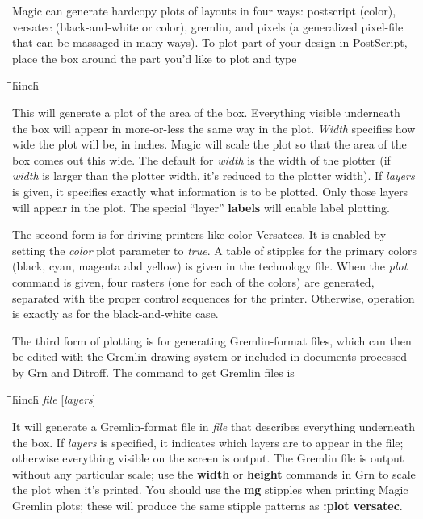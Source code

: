 \documentclass[letterpaper,twoside,12pt]{article}
\def\hinch{\hspace*{0.5in}}
\def\starti{\begin{center}\begin{tabbing}\hinch\=\hinch\=\hinch\=hinch\=\kill}
\def\endi{\end{tabbing}\end{center}}
\def\ii{\>\>\>}
\begin{document}
Magic can generate hardcopy plots of layouts in four ways: postscript
(color), versatec (black-and-white or color), gremlin, and pixels
(a generalized pixel-file that can be massaged in many ways).
To plot part of your design in PostScript, place the box around the
part you'd like to plot and type

\starti
   \ii {\bfseries :plot postscript}
\endi

This will generate a plot of the area of the box.  Everything
visible underneath the box will appear in more-or-less the same way
in the plot.  {\itshape Width} specifies how wide the plot will be, in
inches.  Magic will scale the plot so that the area of the box comes
out this wide.  The default for {\itshape width} is the width of the
plotter (if {\itshape width} is larger than the plotter width, it's
reduced to the plotter width).  If {\itshape layers} is given, it
specifies exactly what information is to be plotted.  Only those
layers will appear in the plot.  The special ``layer'' {\bfseries labels}
will enable label plotting.

The second form is for driving printers like color Versatecs.
It  is enabled by setting the {\itshape color} plot parameter to
{\itshape true}.  A table of stipples for the primary colors (black, cyan,
magenta abd yellow) is given in the technology file.  When the
{\itshape plot} command is given, four rasters (one for each of the colors)
are generated, separated with the proper control sequences for the printer.
Otherwise, operation is exactly as for the black-and-white case.

The third form of plotting is for generating Gremlin-format files,
which can then be edited with the Gremlin drawing system or
included in documents processed by Grn and Ditroff.  The command
to get Gremlin files is

\starti
   \ii {\bfseries :plot gremlin} {\itshape file }[{\itshape layers}]
\endi

It will generate a Gremlin-format file in {\itshape file} that describes
everything underneath the box.  If {\itshape layers} is specified, it
indicates which layers are to appear in the file;  otherwise everything
visible on the screen is output.  The Gremlin file is output without
any particular scale;  use the {\bfseries width} or {\bfseries height} commands
in Grn to scale the plot when it's printed.  You should use the {\bfseries mg}
stipples when printing Magic Gremlin plots;  these will produce the
same stipple patterns as {\bfseries :plot versatec}.
\end{document}
